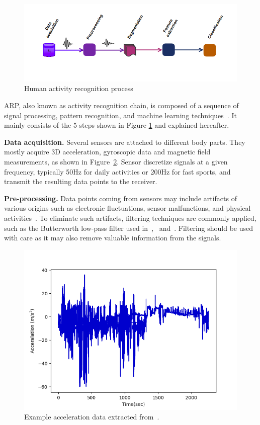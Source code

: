 \documentclass[sigconf]{acmart}
\begin{document}
\begin{figure}[h]
    \centering
    \includegraphics[width=.5\textwidth]{Figures/HARP.png}
    \caption{Human activity recognition process}
    \label{fig:tsprocess}
\end{figure}

ARP, also known as activity recognition 
chain, is composed of a sequence of signal processing, pattern recognition, and 
machine learning techniques~\cite{bulling2014tutorial}. It mainly 
consists of the 5 steps shown in Figure \ref{fig:tsprocess} and 
explained hereafter.

\noindent\textbf{Data acquisition.} Several sensors are attached to different body parts. They mostly acquire 3D acceleration, gyroscopic data and magnetic field measurements, as shown in Figure~\ref{fig:signal}. Sensor discretize signals at a given frequency, typically 50Hz for 
daily activities or 200Hz for fast sports, and transmit the resulting data points to 
the receiver. 

\noindent\textbf{Pre-processing.} Data points coming from sensors may
include artifacts of various origins such as 
electronic fluctuations, sensor malfunctions, and physical activities~\cite{arlot2010survey}. To eliminate such artifacts, filtering techniques are commonly applied, such as the Butterworth low-pass filter used in~\cite{morris2014recofit},~\cite{selles2005automated} and~\cite{najafi2003ambulatory}. 
Filtering should be used with care as it may also remove valuable information from the signals.


\begin{figure}[h]
    \centering
    \includegraphics[width=.4\textwidth]{Figures/signal.png}
    \caption{Example acceleration data extracted from~\cite{banos2012benchmark}.}
    \label{fig:signal}
\end{figure}
\end{document}
